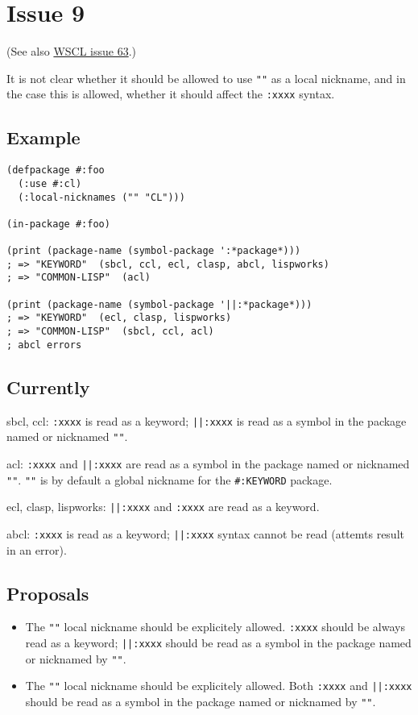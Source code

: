 \documentclass[11pt]{article}
\author{Grolter Bell}
\date{\today}
\title{}
\begin{document}
\section{Issue 9}
\label{sec:orgcbeb620}
(See also \href{https://github.com/s-expressionists/wscl/issues/63}{WSCL issue 63}.)

It is not clear whether it should be allowed to use \texttt{""} as a local nickname,
and in the case this is allowed, whether it should affect the \texttt{:xxxx} syntax.
\subsection{Example}
\label{sec:orgf25a6d8}
\begin{verbatim}
(defpackage #:foo
  (:use #:cl)
  (:local-nicknames ("" "CL")))

(in-package #:foo)

(print (package-name (symbol-package ':*package*)))
; => "KEYWORD"  (sbcl, ccl, ecl, clasp, abcl, lispworks)
; => "COMMON-LISP"  (acl)

(print (package-name (symbol-package '||:*package*)))
; => "KEYWORD"  (ecl, clasp, lispworks)
; => "COMMON-LISP"  (sbcl, ccl, acl)
; abcl errors
\end{verbatim}
\subsection{Currently}
\label{sec:orgd2884e5}
sbcl, ccl:
\texttt{:xxxx} is read as a keyword;
\texttt{||:xxxx} is read as a symbol in the package named or nicknamed \texttt{""}.

acl:
\texttt{:xxxx} and \texttt{||:xxxx} are read as a symbol in the package named or nicknamed \texttt{""}.
\texttt{""} is by default a global nickname for the \texttt{\#:KEYWORD} package.

ecl, clasp, lispworks:
\texttt{||:xxxx} and \texttt{:xxxx} are read as a keyword.

abcl:
\texttt{:xxxx} is read as a keyword;
\texttt{||:xxxx} syntax cannot be read (attemts result in an error).
\subsection{Proposals}
\label{sec:orgcf94c06}
\begin{itemize}
\item The \texttt{""} local nickname should be explicitely allowed.
\texttt{:xxxx} should be always read as a keyword;
\texttt{||:xxxx} should be read as a symbol in the package named or nicknamed by \texttt{""}.
\item The \texttt{""} local nickname should be explicitely allowed.
Both \texttt{:xxxx} and \texttt{||:xxxx} should be read as a symbol in the package
named or nicknamed by \texttt{""}.
\end{itemize}
\end{document}
